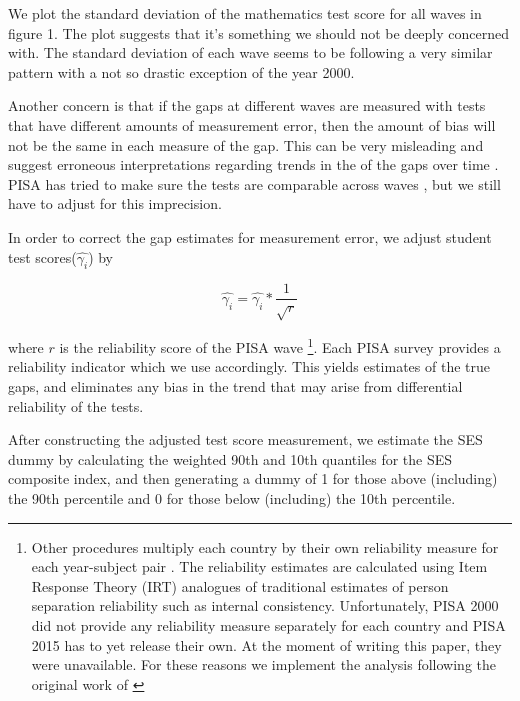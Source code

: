 \documentclass[11pt, a4paper]{article}\usepackage[]{graphicx}\usepackage[]{color}
\begin{document}
We plot the standard deviation of the mathematics test score for all waves in figure 1. The plot suggests that it's something we should not be deeply concerned with. The standard deviation of each wave seems to be following a very similar pattern with a not so drastic exception of the year 2000.

Another concern is that if the gaps at different waves are measured with tests that have different amounts of measurement error, then the amount of bias will not be the same in each measure of the gap. This can be very misleading and suggest erroneous interpretations regarding trends in the of the gaps over time \citep{reardon2011}. PISA has tried to make sure the tests are comparable across waves \citep{pisa2012_technical}, but we still have to adjust for this imprecision.

In order to correct the gap estimates for measurement error, we adjust student test scores(\begin{math} \hat{\gamma_i} \end{math}) by

\begin{equation}
\hat{\gamma_i} = \hat{\gamma_i} * \frac{1}{\sqrt{r}}
\end{equation}

where \begin{math}r\end{math} is the reliability score of the PISA wave \footnote{Other procedures multiply each country by their own reliability measure for each year-subject pair \citep{anna2016_global}. The reliability estimates are calculated using Item Response Theory (IRT) analogues of traditional estimates of person separation reliability such as internal consistency. Unfortunately, PISA 2000 did not provide any reliability measure separately for each country and PISA 2015 has to yet release their own. At the moment of writing this paper, they were unavailable. For these reasons we implement the analysis following the original work of \citet{reardon2011}}. Each PISA survey provides a reliability indicator which we use accordingly. This yields estimates of the true gaps, and eliminates any bias in the trend that may arise from differential reliability of the tests.

After constructing the adjusted test score measurement, we estimate the SES dummy by calculating the weighted 90th and 10th quantiles for the SES composite index, and then generating a dummy of 1 for those above (including) the 90th percentile and 0 for those below (including) the 10th percentile.
\end{document}
